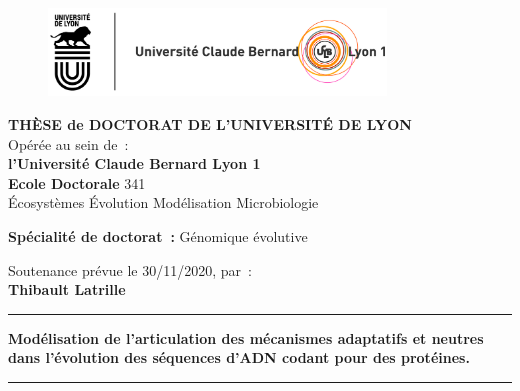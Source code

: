 \thispagestyle{empty}

\unitlength 1cm
\begin{center}
	
	\vspace*{-2.5cm}
	\begin{figure}[h]
		\centering
		\includegraphics[width=0.8\textwidth]{figures/logos.jpg}
	\end{figure}
	
	
	
	{\large \textbf{THÈSE de DOCTORAT DE L'UNIVERSITÉ DE LYON}\\}
	{Opérée au sein de~:\\}
	{\large \textbf{l'Université Claude Bernard Lyon 1}\\}
	\vspace{12pt}
	{\large \textbf{Ecole Doctorale} 341 \\Écosystèmes Évolution Modélisation Microbiologie}
	
	
	\vspace{12pt}
	
	{\large \textbf{Spécialité de doctorat~:} Génomique évolutive
		\\}
	
	\vspace{0.8cm}
	
	{Soutenance prévue le 30/11/2020, par~:\\}
	\vspace{0.15cm} 
	{\Large \textbf{Thibault Latrille}}
	\vspace{0.5cm}           
	
	
	\rule{5cm}{1pt}
	\vspace{12pt}
	
	{\huge \textbf{Modélisation de l'articulation des mécanismes adaptatifs et neutres dans l’évolution des séquences d’ADN codant pour des protéines.}\par}
	
	\vspace{12pt}
	\rule{5cm}{1pt}
	
	\vspace{0.5cm}
	
\end{center}

